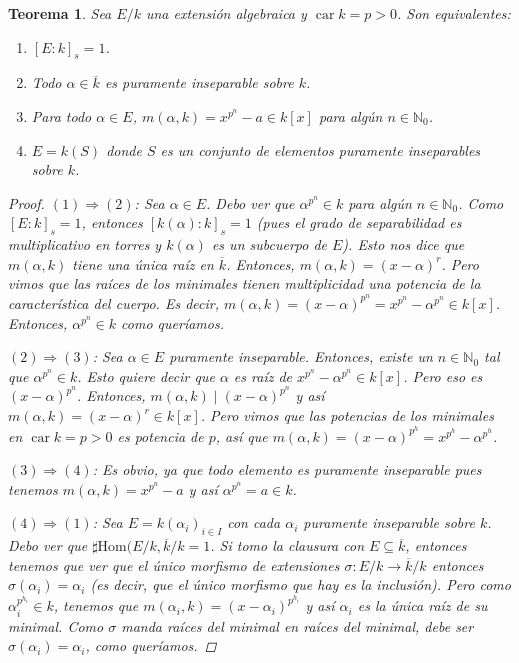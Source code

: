 \documentclass[12pt]{book}
\newtheorem{teo}{Teorema}[section]
\theoremstyle{definition}
\newcommand{\NN}{\mathbb{N}}
\renewcommand{\hom}{\mathrm{Hom}}
\DeclareMathOperator{\car}{car}
\begin{document}
\begin{teo}
Sea $E/k$ una extensión algebraica y $\car k = p >0$. Son equivalentes:
\begin{enumerate}
\item $[E:k]_s = 1$.
\item Todo $\alpha\in\overline{k}$ es puramente inseparable sobre $k$.
\item Para todo $\alpha\in E$, $m(\alpha,k) = x^{p^n}-a\in k[x]$ para algún $n\in\NN_0$.
\item $E=k(S)$ donde $S$ es un conjunto de elementos puramente inseparables sobre $k$.
\end{enumerate}
\begin{proof}
$(1)\Longrightarrow (2)$: Sea $\alpha\in E$. Debo ver que $\alpha^{p^n}\in k$ para algún $n\in\NN_0$. Como $[E:k]_s=1$, entonces $[k(\alpha):k]_s=1$ (pues el grado de separabilidad es multiplicativo en torres y $k(\alpha)$ es un subcuerpo de $E$). Esto nos dice que $m(\alpha,k)$ tiene una única raíz en $\overline{k}$. Entonces, $m(\alpha,k) = (x-\alpha)^r$. Pero vimos que las raíces de los minimales tienen multiplicidad una potencia de la característica del cuerpo. Es decir, $m(\alpha,k) = (x-\alpha)^{p^n} = x^{p^n} - \alpha^{p^n}\in k[x]$. Entonces, $\alpha^{p^n}\in k$ como queríamos.

$(2)\Longrightarrow (3)$: Sea $\alpha\in E$ puramente inseparable. Entonces, existe un $n\in\NN_0$ tal que $\alpha^{p^n}\in k$. Esto quiere decir que $\alpha$ es raíz de $x^{p^n} - \alpha^{p^n}\in k[x]$. Pero eso es $(x-\alpha)^{p^n}$. Entonces, $m(\alpha,k)\mid (x-\alpha)^{p^n}$ y así $m(\alpha,k) = (x-\alpha)^r\in k[x]$. Pero vimos que las potencias de los minimales en $\car k = p>0$ es potencia de $p$, así que $m(\alpha,k) = (x-\alpha)^{p^h} = x^{p^h} - \alpha^{p^h}$.

$(3)\Longrightarrow (4)$: Es obvio, ya que todo elemento es puramente inseparable pues tenemos $m(\alpha,k)=x^{p^n}-a$ y así $\alpha^{p^n}= a\in k$.

$(4)\Longrightarrow (1)$: Sea $E=k(\alpha_i)_{i\in I}$ con cada $\alpha_i$ puramente inseparable sobre $k$. Debo ver que $\sharp \hom(E/k,\overline{k}/k=1$. Si tomo la clausura con $E\subseteq \overline{k}$, entonces tenemos que ver que el único morfismo de extensiones $\sigma:E/k\to\overline{k}/k$ entonces $\sigma(\alpha_i) = \alpha_i$ (es decir, que el único morfismo que hay es la inclusión). Pero como $\alpha_i^{p^{h_i}}\in k$, tenemos que $m(\alpha_i,k) = (x-\alpha_i)^{p^{h_i}}$ y así $\alpha_i$ es la única raíz de su minimal. Como $\sigma$ manda raíces del minimal en raíces del minimal, debe ser $\sigma(\alpha_i)=\alpha_i$, como queríamos.
\end{proof}
\end{teo}
\end{document}
